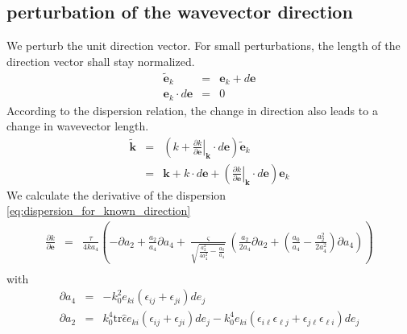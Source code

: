 \documentclass[12pt,a4paper,twoside,openright,BCOR10mm,headsepline,titlepage,abstracton,chapterprefix,final]{scrreprt}
\newcommand\Vector[1]{{\mathbf{#1}}}
\newcommand\wavenumber{k}
\newcommand\Wavevector{\Vector{\wavenumber}}
\newcommand\Tensor[1]{\hat{#1}}
\newcommand\scalarrelativepermittivity{\epsilon}
\newcommand\relativepermittivity{\Tensor{\scalarrelativepermittivity}}
\begin{document}
\subsection{perturbation of the wavevector direction}
We perturb the unit direction vector. For small perturbations, the length of the direction vector shall stay normalized.
\begin{eqnarray}
 \tilde{\Vector{e}}_\wavenumber &=& \Vector{e}_\wavenumber + d\Vector{e} \\
 \Vector{e}_\wavenumber \cdot d\Vector{e} &=& 0
\end{eqnarray}
According to the dispersion relation, the change in direction also leads to a change in wavevector length.
\begin{eqnarray}
 \tilde{\Wavevector} &=& 
     \left( 
         \wavenumber + \left. \frac{\partial \wavenumber}{\partial \Vector{e}}\right|_{\Wavevector} \cdot d\Vector{e} 
     \right)
     \tilde{\Vector{e}}_\wavenumber 
 \\
 &=& \Wavevector + \wavenumber \cdot d\Vector{e} + \left( \left. \frac{\partial \wavenumber}{\partial \Vector{e}}\right|_{\Wavevector} \cdot d\Vector{e} \right) \Vector{e}_\wavenumber
\end{eqnarray}
We calculate the derivative of the dispersion \ref{eq:dispersion_for_known_direction}
\begin{eqnarray}
 \frac{\partial \wavenumber}{\partial \Vector{e}} &=&
     \frac{\tau}{4 \wavenumber a_4}
     \left(
         - \partial a_2 + \frac{a_2}{a_4} \partial a_4 
         +  \frac{\varsigma}{\sqrt{\frac{a_2^2}{4 a_4^2} - \frac{a_0}{a_4}}}
                \left( \frac{a_2}{2 a_4} \partial a_2 + \left( \frac{a_0}{a_4} - \frac{a_2^2}{2 a_4^2} \right) \partial a_4 \right)
     \right)
 \nonumber\\
\end{eqnarray}
with
\begin{eqnarray}
 \partial a_4 &=& - k_0^2  e_{ki} ( \scalarrelativepermittivity_{ij} + \scalarrelativepermittivity_{ji} ) de_{j} \\
 \partial a_2 &=&    k_0^4 \text{tr} \relativepermittivity e_{ki} ( \scalarrelativepermittivity_{ij} + \scalarrelativepermittivity_{ji} ) de_{j} - k_0^4 e_{ki} ( \scalarrelativepermittivity_{i\ell} \scalarrelativepermittivity_{\ell j} + \scalarrelativepermittivity_{j\ell} \scalarrelativepermittivity_{\ell i} ) de_j
\end{eqnarray}
\end{document}
